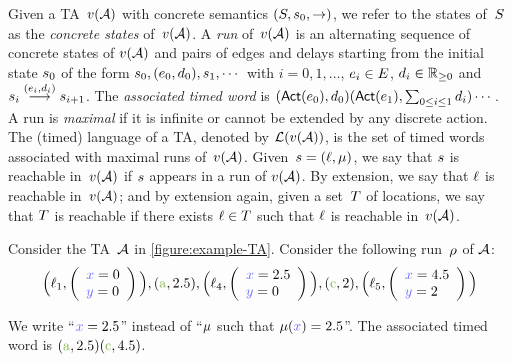 \begin{tikzborder}{\cite{Gargantini16:validation}}
\begin{tikzborder}{\cite{gargantini_combinatorial_2017}}
\begin{tikzborder}{\cite{gargantini_combinatorial_2017}}
\begin{tikzborder}{\cite{garn2019}}
\begin{tikzborder}{\cite{arcaini2019achieving}}
\begin{tikzborder}{\cite{arcaini2019varivolution}}
\begin{tikzborder}{}
Given a TA~$v(\mathcal{A})$ with concrete semantics $(S, s_0, {\rightarrow})$, we refer to the states of~$S$ as the \emph{concrete states} of~$v(\mathcal{A})$.
A \emph{run} of~$v(\mathcal{A})$ is an %
alternating sequence of concrete states of $v(\mathcal{A})$ and pairs of edges and delays starting from the initial state $s_0$ of the form
$s_0, (e_0, d_0), s_1, \cdots$
with
$i = 0, 1, \dots$, $e_i \in E$, $d_i \in {\mathbb{R}}_{\geq 0}$ and
$s_i \stackrel{(e_i, d_i)}{\longrightarrow} s_{i+1}$.
The \emph{associated timed word} is $(\mathsf{Act}(e_0) , d_0) (\mathsf{Act}(e_1), \sum_{0 \leq i \leq 1} d_i) \cdots$.
A run is \emph{maximal} if it is infinite or cannot be extended by any discrete action.
The (timed) language of a TA, denoted by $\mathcal{L}(v(\mathcal{A}))$, is the set of timed words associated with maximal runs of~$v(\mathcal{A})$.
Given~$s=(\ell, \mu)$, we say that $s$ is reachable in~$v(\mathcal{A})$ if $s$ appears in a run of $v(\mathcal{A})$.
By extension, we say that $\ell$ is reachable in~$v(\mathcal{A})$; and by extension again, given a set~$T$ of locations, we say that $T$ is reachable if there exists $\ell \in T$ such that $\ell$ is reachable in~$v(\mathcal{A})$.


\begin{example}
	Consider the TA~$\mathcal{A}$ in \ref{figure:example-TA}.
	Consider the following run~$\rho$ of $\mathcal{A}$:
	\[
	\Big(\loc_1,
	\left ( \begin{array}{l}
	\styleclock{x} = 0 \\
	\styleclock{y} = 0 \\
	\end{array}
	\right ) \Big)
	,
	(\styleact{a}, 2.5)
	,
	\Big(\loc_4,
	\left ( \begin{array}{l}
	\styleclock{x} = 2.5 \\
	\styleclock{y} = 0 \\
	\end{array}
	\right ) \Big)
	,
	(\styleact{c}, 2)
	,
	\Big(\loc_5,
	\left ( \begin{array}{l}
	\styleclock{x} = 4.5 \\
	\styleclock{y} = 2 \\
	\end{array}
	\right ) \Big)
	\]
	
	We write ``$\styleclock{\clock} = 2.5$'' instead of ``$\mu$ such that $\clockval(\styleclock{\clock}) = 2.5$''.
	The associated timed word is $(\styleact{a}, 2.5) (\styleact{c}, 4.5)$.
\end{example}
\end{tikzborder}


\end{tikzborder}
\end{tikzborder}
\end{tikzborder}
\end{tikzborder}
\end{tikzborder}
\end{tikzborder}
